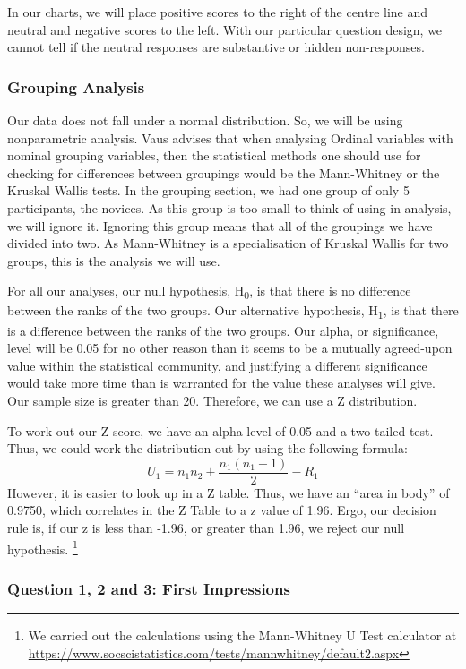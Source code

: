 In our charts, we will place positive scores to the right of the centre line and neutral and negative scores to the left.
With our particular question design, we cannot tell if the neutral responses are substantive or hidden non-responses\cite{blasius2001use}.

\subsubsection{Grouping Analysis}
Our data does not fall under a normal distribution. 
So, we will be using nonparametric analysis.
Vaus\cite{de2013surveys} advises that when analysing Ordinal variables with nominal grouping variables, then the statistical methods one should use for checking for differences between groupings would be the Mann-Whitney\cite{mann1947test} or the Kruskal Wallis\cite{kruskal1952use} tests.
In the grouping section, we had one group of only 5 participants, the novices.
As this group is too small to think of using in analysis, we will ignore it.
Ignoring this group means that all of the groupings we have divided into two.
As Mann-Whitney is a specialisation of Kruskal Wallis for two groups, this is the analysis we will use.

For all our analyses, our null hypothesis, H\textsubscript{0}, is that there is no difference between the ranks of the two groups. 
Our alternative hypothesis, H\textsubscript{1}, is that there is a difference between the ranks of the two groups.
Our alpha, or significance, level will be 0.05 for no other reason than it seems to be a mutually agreed-upon value within the statistical community, and justifying a different significance would take more time than is warranted for the value these analyses will give.
Our sample size is greater than 20. 
Therefore, we can use a Z distribution.

To work out our Z score, we have an alpha level of 0.05 and a two-tailed test.
Thus, we could work the distribution out by using the following formula:
\[U_{1}=n_{1}n_{2}+\frac{n_{1}(n_{1}+1)}{2}-R_{1}\]
However, it is easier to look up in a Z table.
Thus, we have an ``area in body'' of 0.9750, which correlates in the Z Table to a z value of 1.96.
Ergo, our decision rule is, if our z is less than -1.96, or greater than 1.96, we reject our null hypothesis.
\footnote{We carried out the calculations using the Mann-Whitney U Test calculator at \url{https://www.socscistatistics.com/tests/mannwhitney/default2.aspx}}

\subsubsection{Question 1, 2 and 3: First Impressions}

